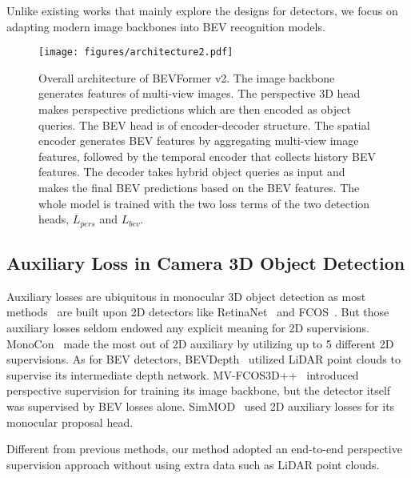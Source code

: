 \documentclass[10pt,twocolumn,letterpaper]{article}
\begin{document}
Unlike existing works that mainly explore the designs for detectors, we focus on adapting modern image backbones into BEV recognition models. 

\begin{figure*}[t]
    \centering
    \texttt{[image: figures/architecture2.pdf]}
    \caption{Overall architecture of BEVFormer v2. The image backbone generates features of multi-view images. The perspective 3D head makes perspective predictions which are then encoded as object queries. The BEV head is of encoder-decoder structure. The spatial encoder generates BEV features by aggregating multi-view image features, followed by the temporal encoder that collects history BEV features. The decoder takes hybrid object queries as input and makes the final BEV predictions based on the BEV features. The whole model is trained with the two loss terms of the two detection heads, $L_{pers}$ and $L_{bev}$.}
    \label{fig:architecture}
\end{figure*}

\subsection{Auxiliary Loss in Camera 3D Object Detection}
Auxiliary losses are ubiquitous in monocular 3D object detection as most methods~\cite{MonoDIS,monoflex,fcos3d,DD3D,MonoCon,bevdepth,mv-fcos3d} are built upon 2D detectors like RetinaNet~\cite{RetinaNet} and FCOS~\cite{fcos}.
But those auxiliary losses seldom endowed any explicit meaning for 2D supervisions.
MonoCon~\cite{MonoCon} made the most out of 2D auxiliary by utilizing up to 5 different 2D supervisions.
As for BEV detectors, BEVDepth~\cite{bevdepth} utilized LiDAR point clouds to supervise its intermediate depth network.
MV-FCOS3D++~\cite{mv-fcos3d} introduced perspective supervision for training its image backbone, but the detector itself was supervised by BEV losses alone.
SimMOD~\cite{SimMOD} used 2D auxiliary losses for its monocular proposal head.

Different from previous methods, our method adopted an end-to-end perspective supervision approach without using extra data such as LiDAR point clouds.
\end{document}
